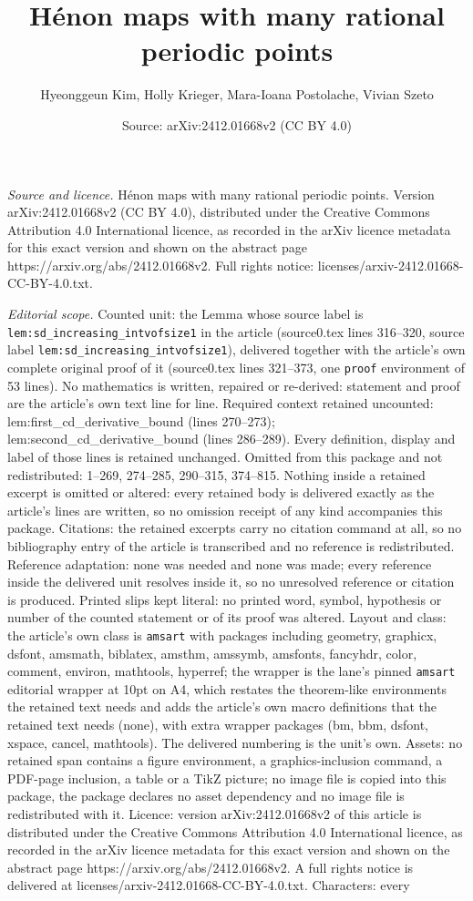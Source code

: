 \documentclass[10pt,a4paper]{amsart}
\title[H\'enon maps with many rational periodic points]{H\'enon maps with many rational periodic points}
\author{Hyeonggeun Kim, Holly Krieger, Mara-Ioana Postolache, Vivian Szeto}
\date{Source: arXiv:2412.01668v2 (CC BY 4.0)}
\begin{document}
\maketitle

\noindent\emph{Source and licence.} H\'enon maps with many rational periodic points. Version arXiv:2412.01668v2 (CC BY 4.0), distributed under the Creative Commons Attribution 4.0 International licence, as recorded in the arXiv licence metadata for this exact version and shown on the abstract page https://arxiv.org/abs/2412.01668v2. Full rights notice: licenses/arxiv-2412.01668-CC-BY-4.0.txt.\par\smallskip

\noindent\textit{Editorial scope.} Counted unit: the Lemma whose source label is \texttt{lem:sd\_increasing\_intvofsize1} in the article (source0.tex lines 316--320, source label \texttt{lem:sd\_increasing\_intvofsize1}), delivered together with the article's own complete original proof of it (source0.tex lines 321--373, one \texttt{proof} environment of 53 lines). No mathematics is written, repaired or re-derived: statement and proof are the article's own text line for line. Required context retained uncounted: lem:first\_cd\_derivative\_bound (lines 270--273); lem:second\_cd\_derivative\_bound (lines 286--289). Every definition, display and label of those lines is retained unchanged. Omitted from this package and not redistributed: 1--269, 274--285, 290--315, 374--815. Nothing inside a retained excerpt is omitted or altered: every retained body is delivered exactly as the article's lines are written, so no omission receipt of any kind accompanies this package. Citations: the retained excerpts carry no citation command at all, so no bibliography entry of the article is transcribed and no reference is redistributed. Reference adaptation: none was needed and none was made; every reference inside the delivered unit resolves inside it, so no unresolved reference or citation is produced. Printed slips kept literal: no printed word, symbol, hypothesis or number of the counted statement or of its proof was altered. Layout and class: the article's own class is \texttt{amsart} with packages including geometry, graphicx, dsfont, amsmath, biblatex, amsthm, amssymb, amsfonts, fancyhdr, color, comment, environ, mathtools, hyperref; the wrapper is the lane's pinned \texttt{amsart} editorial wrapper at 10pt on A4, which restates the theorem-like environments the retained text needs and adds the article's own macro definitions that the retained text needs (none), with extra wrapper packages (bm, bbm, dsfont, xspace, cancel, mathtools). The delivered numbering is the unit's own. Assets: no retained span contains a figure environment, a graphics-inclusion command, a PDF-page inclusion, a table or a TikZ picture; no image file is copied into this package, the package declares no asset dependency and no image file is redistributed with it. Licence: version arXiv:2412.01668v2 of this article is distributed under the Creative Commons Attribution 4.0 International licence, as recorded in the arXiv licence metadata for this exact version and shown on the abstract page https://arxiv.org/abs/2412.01668v2. A full rights notice is delivered at licenses/arxiv-2412.01668-CC-BY-4.0.txt. Characters: every 
\end{document}
